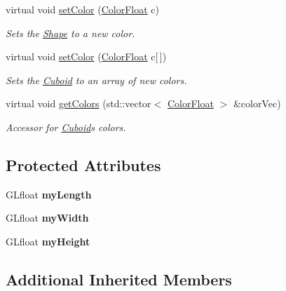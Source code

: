 \begin{DoxyCompactItemize}
virtual void \hyperlink{classtsgl_1_1_cuboid_a683f0eeb463e9779e954955f92f12f8e}{set\+Color} (\hyperlink{structtsgl_1_1_color_float}{Color\+Float} c)
\begin{DoxyCompactList}\small\item\em Sets the \hyperlink{classtsgl_1_1_shape}{Shape} to a new color. \end{DoxyCompactList}\item 
virtual void \hyperlink{classtsgl_1_1_cuboid_aab8a70aff0dcede030ac51277c0dc255}{set\+Color} (\hyperlink{structtsgl_1_1_color_float}{Color\+Float} c\mbox{[}$\,$\mbox{]})
\begin{DoxyCompactList}\small\item\em Sets the \hyperlink{classtsgl_1_1_cuboid}{Cuboid} to an array of new colors. \end{DoxyCompactList}\item 
virtual void \hyperlink{classtsgl_1_1_cuboid_ac3e7d161cb2dbb02cf000e92d84e10ba}{get\+Colors} (std\+::vector$<$ \hyperlink{structtsgl_1_1_color_float}{Color\+Float} $>$ \&color\+Vec)
\begin{DoxyCompactList}\small\item\em Accessor for \hyperlink{classtsgl_1_1_cuboid}{Cuboid}\textquotesingle{}s colors. \end{DoxyCompactList}\end{DoxyCompactItemize}
\subsection*{Protected Attributes}
\begin{DoxyCompactItemize}
\item 
\mbox{\label{classtsgl_1_1_cuboid_ac20cb617d0f65a63ca51e1088f36e6bb}} 
G\+Lfloat {\bfseries my\+Length}
\item 
\mbox{\label{classtsgl_1_1_cuboid_a1e910718e6b411d49f6da3ecdc77c865}} 
G\+Lfloat {\bfseries my\+Width}
\item 
\mbox{\label{classtsgl_1_1_cuboid_affe9afb7d35302a866db56a8d4c190cd}} 
G\+Lfloat {\bfseries my\+Height}
\end{DoxyCompactItemize}
\subsection*{Additional Inherited Members}


